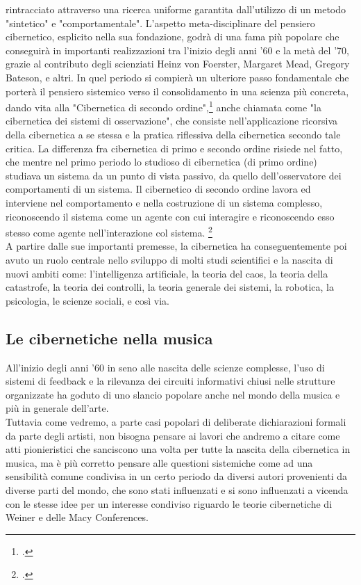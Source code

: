 rintracciato attraverso una ricerca uniforme
garantita dall'utilizzo di un metodo
"sintetico" e "comportamentale". 
L'aspetto meta-disciplinare del pensiero cibernetico,
esplicito nella sua fondazione, godrà di una fama più popolare 
che conseguirà in importanti realizzazioni 
tra l'inizio degli anni '60 e la metà del '70, 
grazie al contributo degli scienziati
Heinz von Foerster, Margaret Mead, Gregory Bateson, e altri.
In quel periodo si compierà un ulteriore passo fondamentale che porterà
il pensiero sistemico verso il consolidamento in una scienza più concreta,
dando vita alla "Cibernetica di secondo ordine",\footcite{wikisecondordercyb}
anche chiamata come "la cibernetica dei sistemi di osservazione",
che consiste nell'applicazione
ricorsiva della cibernetica a se stessa e la pratica riflessiva della cibernetica
secondo tale critica.
La differenza fra cibernetica di primo e secondo ordine risiede nel fatto,
che mentre nel primo periodo lo studioso di cibernetica (di primo ordine)
studiava un sistema da un punto di vista passivo, da quello dell'osservatore
dei comportamenti di un sistema.
Il  cibernetico di secondo ordine lavora ed interviene nel comportamento
e nella costruzione di un sistema complesso,
riconoscendo il sistema come un agente con cui interagire e
riconoscendo esso stesso come agente nell'interazione col sistema.
\footcite{scottsecondordercyb}
\\ A partire dalle sue importanti premesse,
la cibernetica ha conseguentemente poi avuto un ruolo centrale nello sviluppo di
molti studi scientifici e la nascita
di nuovi ambiti come: l'intelligenza artificiale, la teoria del caos,
la teoria della catastrofe,
la teoria dei controlli, la teoria generale dei sistemi, la robotica,
la psicologia, le scienze sociali, e così via.

\subsection{Le cibernetiche nella musica}
\label{sec:Le cibernetiche nella musica}
All'inizio degli anni '60 in seno alle nascita delle scienze complesse,
l'uso di sistemi di feedback e la rilevanza dei circuiti informativi chiusi
nelle strutture organizzate
ha goduto di uno slancio popolare anche nel mondo della musica
e più in generale dell'arte. \\
Tuttavia come vedremo, a parte casi popolari di deliberate dichiarazioni
formali da parte degli artisti, non bisogna pensare ai lavori che andremo a citare
come atti pionieristici che sanciscono una volta per tutte la nascita della cibernetica in musica,
ma è più corretto pensare alle questioni sistemiche come ad una sensibilità
comune condivisa in un certo periodo da diversi autori provenienti da diverse parti del mondo,
che sono stati influenzati e si sono influenzati a vicenda
con le stesse idee per un interesse condiviso riguardo
le teorie cibernetiche di Weiner e delle Macy Conferences.

